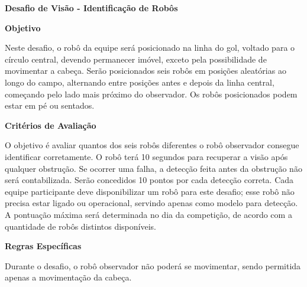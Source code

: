\clearpage
\sffamily
{\bfseries\color[rgb]{0.4,0.4,0.4}Desafio de Visão - Identificação de Robôs}
{}

\bigskip

{\bfseries Objetivo}

\headlinebox

Neste desafio, o robô da equipe será posicionado na linha do gol, voltado para o círculo central, devendo permanecer imóvel, exceto pela possibilidade de movimentar a cabeça. Serão posicionados seis robôs em posições aleatórias ao longo do campo, alternando entre posições antes e depois da linha central, começando pelo lado mais próximo do observador. Os robôs posicionados podem estar em pé ou sentados.

\bigskip

{\bfseries Critérios de Avaliação}

\headlinebox

O objetivo é avaliar quantos dos seis robôs diferentes o robô observador consegue identificar corretamente. O robô terá 10 segundos para recuperar a visão após qualquer obstrução. Se ocorrer uma falha, a detecção feita antes da obstrução não será contabilizada. Serão concedidos 10 pontos por cada detecção correta. Cada equipe participante deve disponibilizar um robô para este desafio; esse robô não precisa estar ligado ou operacional, servindo apenas como modelo para detecção. A pontuação máxima será determinada no dia da competição, de acordo com a quantidade de robôs distintos disponíveis.

\bigskip

{\bfseries Regras Específicas}

\headlinebox

Durante o desafio, o robô observador não poderá se movimentar, sendo permitida apenas a movimentação da cabeça.